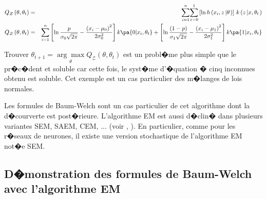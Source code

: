         \begin{eqnarray*}
        Q_{\mathcal{Z}}\left(  \theta,\theta_{t}\right)   &=& \overset {n}{\underset{i=1}{\sum}}\overset{1}
        {\underset{z=0}{\sum}}\left[  \ln h\left(
            x_{i},z\left|  \theta\right.  \right)  \right]  \,k\left(  z\left|x,\theta_{t}\right.  \right)\\
        Q_{\mathcal{Z}}\left(  \theta,\theta_{t}\right)   &=& \overset {n}{\underset{i=1}{\sum}}
                \left[  \ln\dfrac{p}{\sigma_0 \sqrt{2\pi}} - \dfrac{\left(  x_{i}-\mu_{0}\right) ^{2}}
                {2\sigma_{0}^{2}}\right] k\pa{0 |x_i,\theta_t}
            +   \left[  \ln\dfrac{\left(  1-p\right) }{\sigma_1 \sqrt{2\pi}}-\dfrac{\left(  x_i-\mu_{1}\right) ^{2}}
                    {2\sigma_{1}^{2} }\right] k\pa{1 |x_i,\theta_t}
        \end{eqnarray*}

Trouver $\theta_{t+1}=\underset{\theta}{\arg\max}Q_{\mathcal{Z}}\left( \theta,\theta_{t}\right)  $ est un probl�me plus simple que le pr�c�dent et soluble car cette fois, le syst�me d'�quation � cinq inconnues obtenu est soluble. Cet exemple est un cas particulier des m�langes de lois normales.


Les formules de Baum-Welch sont un cas particulier de cet algorithme dont la d�courverte est post�rieure. L'algorithme EM est aussi d�clin� dans plusieurs variantes SEM, SAEM, CEM, ... (voir , ). En particulier, comme pour les r�seaux de neurones, il existe une version stochastique de l'algorithme EM not�e SEM.










\subsection{D�monstration des formules de Baum-Welch avec l'algorithme EM}

